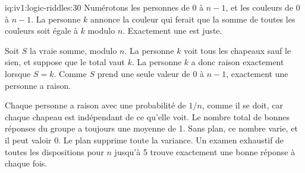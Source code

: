 \begin{solution}{iq:iv1:logic-riddles:30}
Numérotons les personnes de 0 à $n - 1$, et les couleurs de 0 à $n - 1$. La personne $k$ annonce la couleur qui ferait que la somme de toutes les couleurs soit égale à $k$ modulo $n$. Exactement une est juste.

Soit $S$ la vraie somme, modulo $n$. La personne $k$ voit tous les chapeaux sauf le sien, et suppose que le total vaut $k$. La personne $k$ a donc raison exactement lorsque $S = k$. Comme $S$ prend une seule valeur de $0$ à $n - 1$, exactement une personne a raison.

Chaque personne a raison avec une probabilité de $1/n$, comme il se doit, car chaque chapeau est indépendant de ce qu'elle voit. Le nombre total de bonnes réponses du groupe a toujours une moyenne de 1. Sans plan, ce nombre varie, et il peut valoir 0. Le plan supprime toute la variance. Un examen exhaustif de toutes les dispositions pour $n$ jusqu'à 5 trouve exactement une bonne réponse à chaque fois.

\end{solution}

